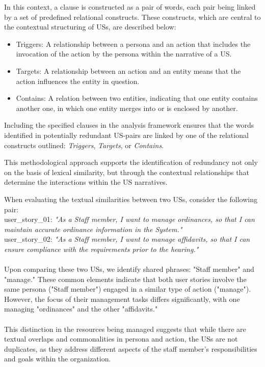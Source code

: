 \begin{definition}
	In this context, a clause is constructed as a pair of words, each pair being linked by a set of predefined relational constructs. These constructs, which are central to the contextual structuring of USs, are described below:
	\begin{itemize}
		
		\item Triggers: A relationship between a persona and an action that includes the invocation of the action by the persona within the narrative of a US.
		
		\item Targets: A relationship between an action and an entity means that the action influences the entity in question.
		
		\item Contains: A relation between two entities, indicating that one entity contains another one, in which one entity merges into or is enclosed by another. 
		
	\end{itemize}
	Including the specified clauses in the analysis framework ensures that the words identified in potentially redundant US-pairs are linked by one of the relational constructs outlined: \textit{Triggers}, \textit{Targets}, or \textit{Contains}. 
	
	This methodological approach supports the identification of redundancy not only on the basis of lexical similarity, but through the contextual relationships that determine the interactions within the US narratives.
\end{definition}
\begin{example}
	When evaluating the textual similarities between two USs, consider the following pair: \\
	user\_story\_01: \textit{"As a Staff member, I want to manage ordinances, so that I can maintain accurate ordinance information in the System."}\\
	user\_story\_02: \textit{"As a Staff member, I want to manage affidavits, so that I can ensure compliance with the requirements prior to the hearing."} \\\\
	Upon comparing these two USs, we identify shared phrases: "Staff member" and "manage." These common elements indicate that both user stories involve the same persona ("Staff member") engaged in a similar type of action ("manage"). However, the focus of their management tasks differs significantly, with one managing "ordinances" and the other "affidavits."\\\\
	This distinction in the resources being managed suggests that while there are textual overlaps and commonalities in persona and action, the USs are not duplicates, as they address different aspects of the staff member's responsibilities and goals within the organization.
\end{example}

